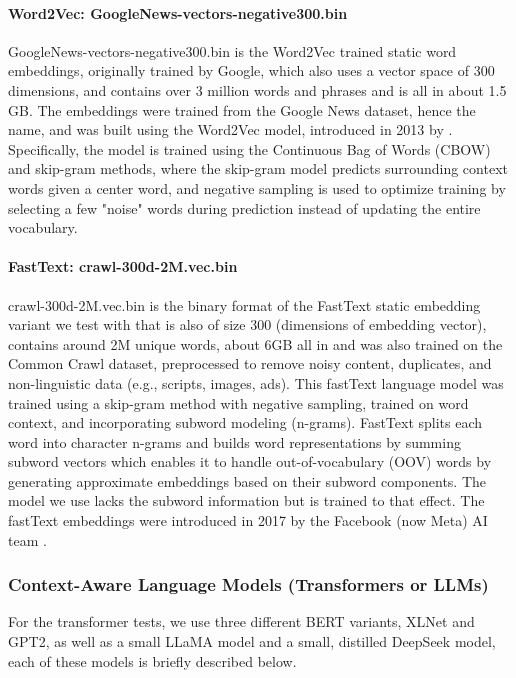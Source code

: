 \documentclass[final]{clv2025}
\begin{document}
\paragraph{Word2Vec: GoogleNews-vectors-negative300.bin}

GoogleNews-vectors-negative300.bin is the Word2Vec trained static word embeddings, originally trained by Google, which also uses a vector space of 300 dimensions, and contains over 3 million words and phrases and is all in about 1.5 GB. The embeddings were trained from the Google News dataset, hence the name, and was built using the Word2Vec model, introduced in 2013 by \cite{mikolov}. Specifically, the model is trained using the Continuous Bag of Words (CBOW) and skip-gram methods, where the skip-gram model predicts surrounding context words given a center word, and negative sampling is used to optimize training by selecting a few "noise" words during prediction instead of updating the entire vocabulary.

\paragraph{FastText: crawl-300d-2M.vec.bin}

crawl-300d-2M.vec.bin is the binary format of the FastText static embedding variant we test with that is also of size 300 (dimensions of embedding vector), contains around 2M unique words, about 6GB all in and was also trained on the Common Crawl dataset, preprocessed to remove noisy content, duplicates, and non-linguistic data (e.g., scripts, images, ads). This fastText language model was trained using a skip-gram method with negative sampling, trained on word context, and incorporating subword modeling (n-grams). FastText splits each word into character n-grams and builds word representations by summing subword vectors which enables it to handle out-of-vocabulary (OOV) words by generating approximate embeddings based on their subword components. The model we use lacks the subword information but is trained to that effect. The fastText embeddings were introduced in 2017 by the Facebook (now Meta) AI team \cite{articleboja}.

\subsubsection{Context-Aware Language Models (Transformers or LLMs)}
For the transformer tests, we use three different BERT variants, XLNet and GPT2, as well as a small LLaMA model and a small, distilled DeepSeek model, each of these models is briefly described below.
\end{document}
